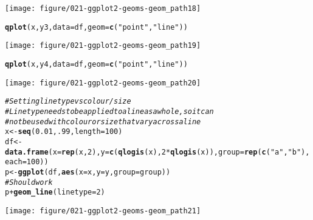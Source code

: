 \documentclass[a4paper,titlepage]{tufte-handout}\usepackage[]{graphicx}\usepackage[]{color}
\makeatletter
\def\maxwidth{ %
  \ifdim\Gin@nat@width>\linewidth
    \linewidth
  \else
    \Gin@nat@width
  \fi
}
\newcommand{\hlnum}[1]{\textcolor[rgb]{0.686,0.059,0.569}{#1}}%
\newcommand{\hlstr}[1]{\textcolor[rgb]{0.192,0.494,0.8}{#1}}%
\newcommand{\hlcom}[1]{\textcolor[rgb]{0.678,0.584,0.686}{\textit{#1}}}%
\newcommand{\hlopt}[1]{\textcolor[rgb]{0,0,0}{#1}}%
\newcommand{\hlstd}[1]{\textcolor[rgb]{0.345,0.345,0.345}{#1}}%
\newcommand{\hlkwb}[1]{\textcolor[rgb]{0.69,0.353,0.396}{#1}}%
\newcommand{\hlkwc}[1]{\textcolor[rgb]{0.333,0.667,0.333}{#1}}%
\newcommand{\hlkwd}[1]{\textcolor[rgb]{0.737,0.353,0.396}{\textbf{#1}}}%
\newenvironment{kframe}{%
 \def\at@end@of@kframe{}%
 \ifinner\ifhmode%
  \def\at@end@of@kframe{\end{minipage}}%
  \begin{minipage}{\columnwidth}%
 \fi\fi%
 \def\FrameCommand##1{\hskip\@totalleftmargin \hskip-\fboxsep
 \colorbox{shadecolor}{##1}\hskip-\fboxsep
     \hskip-\linewidth \hskip-\@totalleftmargin \hskip\columnwidth}%
 \MakeFramed {\advance\hsize-\width
   \@totalleftmargin\z@ \linewidth\hsize
   \@setminipage}}%
 {\par\unskip\endMakeFramed%
 \at@end@of@kframe}
\newenvironment{knitrout}{}{} %
\makeatother
\begin{document}
\begin{knitrout}
\begin{kframe}
{\ttfamily\noindent\color{warningcolor}{\#\# Warning: Removed 1 rows containing missing values (geom\_point).\\\#\# Warning: Removed 1 rows containing missing values (geom\_path).}}\end{kframe}
\texttt{[image: figure/021-ggplot2-geoms-geom\_path18]} 
\begin{kframe}\begin{alltt}
\hlkwd{qplot}\hlstd{(x, y3,} \hlkwc{data} \hlstd{= df,} \hlkwc{geom} \hlstd{=} \hlkwd{c}\hlstd{(}\hlstr{"point"}\hlstd{,}\hlstr{"line"}\hlstd{))}
\end{alltt}


{\ttfamily\noindent\color{warningcolor}{\#\# Warning: Removed 1 rows containing missing values (geom\_point).}}\end{kframe}
\texttt{[image: figure/021-ggplot2-geoms-geom\_path19]} 
\begin{kframe}\begin{alltt}
\hlkwd{qplot}\hlstd{(x, y4,} \hlkwc{data} \hlstd{= df,} \hlkwc{geom} \hlstd{=} \hlkwd{c}\hlstd{(}\hlstr{"point"}\hlstd{,}\hlstr{"line"}\hlstd{))}
\end{alltt}
\end{kframe}
\texttt{[image: figure/021-ggplot2-geoms-geom\_path20]} 
\begin{kframe}\begin{alltt}
\hlcom{# Setting line type vs colour/size}
\hlcom{# Line type needs to be applied to a line as a whole, so it can}
\hlcom{# not be used with colour or size that vary across a line}
\hlstd{x} \hlkwb{<-} \hlkwd{seq}\hlstd{(}\hlnum{0.01}\hlstd{,} \hlnum{.99}\hlstd{,} \hlkwc{length}\hlstd{=}\hlnum{100}\hlstd{)}
\hlstd{df} \hlkwb{<-} \hlkwd{data.frame}\hlstd{(}\hlkwc{x} \hlstd{=} \hlkwd{rep}\hlstd{(x,} \hlnum{2}\hlstd{),} \hlkwc{y} \hlstd{=} \hlkwd{c}\hlstd{(}\hlkwd{qlogis}\hlstd{(x),} \hlnum{2} \hlopt{*} \hlkwd{qlogis}\hlstd{(x)),} \hlkwc{group} \hlstd{=} \hlkwd{rep}\hlstd{(}\hlkwd{c}\hlstd{(}\hlstr{"a"}\hlstd{,}\hlstr{"b"}\hlstd{),} \hlkwc{each}\hlstd{=}\hlnum{100}\hlstd{))}
\hlstd{p} \hlkwb{<-} \hlkwd{ggplot}\hlstd{(df,} \hlkwd{aes}\hlstd{(}\hlkwc{x}\hlstd{=x,} \hlkwc{y}\hlstd{=y,} \hlkwc{group}\hlstd{=group))}
\hlcom{# Should work}
\hlstd{p} \hlopt{+} \hlkwd{geom_line}\hlstd{(}\hlkwc{linetype} \hlstd{=} \hlnum{2}\hlstd{)}
\end{alltt}
\end{kframe}
\texttt{[image: figure/021-ggplot2-geoms-geom\_path21]} 
\begin{kframe}\begin{alltt}

\end{alltt}
\end{kframe}
\end{knitrout}
\end{document}

